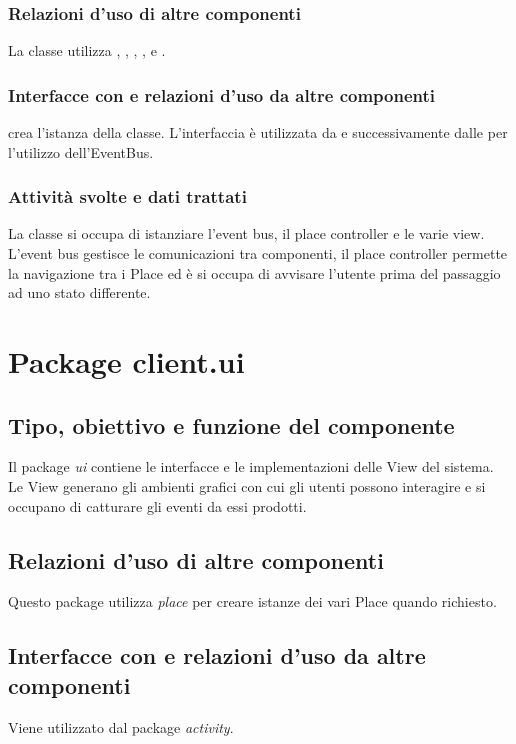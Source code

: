 \subsubsection*{Relazioni d'uso di altre componenti}
La classe utilizza , , ,
,  e
.
\subsubsection*{Interfacce con e relazioni d'uso da altre componenti}
 crea l'istanza della classe. L'interfaccia  \`e
utilizzata da  e successivamente dalle  per
l'utilizzo dell'EventBus.
\subsubsection*{Attivit\`a svolte e dati trattati}
La classe si occupa di istanziare l'event bus, il place controller e le varie
view. L'event bus gestisce le comunicazioni tra componenti, il place
controller permette la navigazione tra i Place ed \`e si occupa di avvisare
l'utente prima del passaggio ad uno stato differente.


\newpage
\section{Package client.ui} %
\subsection*{Tipo, obiettivo e funzione del componente}
Il package \emph{ui} contiene le interfacce e le implementazioni delle View del
sistema. Le View generano gli ambienti grafici con cui gli utenti possono
interagire e si occupano di catturare gli eventi da essi prodotti.

\subsection*{Relazioni d'uso di altre componenti}
Questo package utilizza \emph{place} per creare istanze dei vari Place quando
richiesto.

\subsection*{Interfacce con e relazioni d'uso da altre componenti}
Viene utilizzato dal package \emph{activity}.

